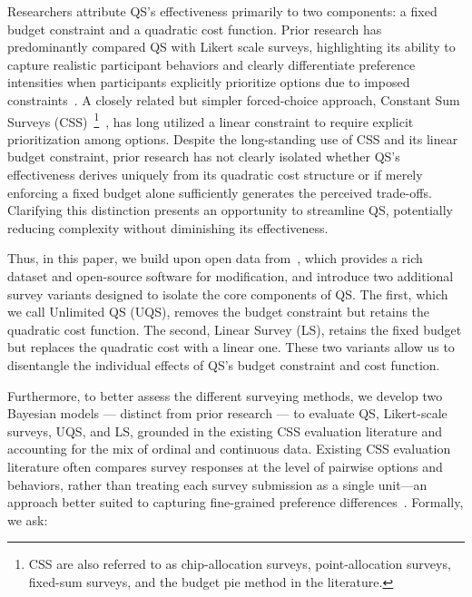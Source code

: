 
Researchers attribute QS's effectiveness primarily to two components: a fixed budget constraint and a quadratic cost function. Prior research has predominantly compared QS with Likert scale surveys, highlighting its ability to capture realistic participant behaviors and clearly differentiate preference intensities when participants explicitly prioritize options due to imposed constraints~\cite{chengCanShowWhat2021, cavaille2024cares}. A closely related but simpler forced-choice approach, Constant Sum Surveys (CSS)~\footnote{CSS are also referred to as chip-allocation surveys, point-allocation surveys, fixed-sum surveys, and the budget pie method in the literature.}~\cite{metfesselProposalQuantitativeReporting1947}, has long utilized a linear constraint to require explicit prioritization among options. Despite the long-standing use of CSS and its linear budget constraint, prior research has not clearly isolated whether QS's effectiveness derives uniquely from its quadratic cost structure or if merely enforcing a fixed budget alone sufficiently generates the perceived trade-offs. Clarifying this distinction presents an opportunity to streamline QS, potentially reducing complexity without diminishing its effectiveness.


Thus, in this paper, we build upon open data from~\citet{chengCanShowWhat2021, illinoisdatabankIDB-1928463}, which provides a rich dataset and open-source software for modification, and introduce two additional survey variants designed to isolate the core components of QS. The first, which we call Unlimited QS (UQS), removes the budget constraint but retains the quadratic cost function. The second, Linear Survey (LS), retains the fixed budget but replaces the quadratic cost with a linear one. These two variants allow us to disentangle the individual effects of QS's budget constraint and cost function.

Furthermore, to better assess the different surveying methods, we develop two Bayesian models --- distinct from prior research --- to evaluate QS, Likert-scale surveys, UQS, and LS, grounded in the existing CSS evaluation literature and accounting for the mix of ordinal and continuous data. Existing CSS evaluation literature often compares survey responses at the level of pairwise options and behaviors, rather than treating each survey submission as a single unit—an approach better suited to capturing fine-grained preference differences~\cite{collewet2023preference, hauserIntensityMeasuresConsumer1980a}. Formally, we ask:

